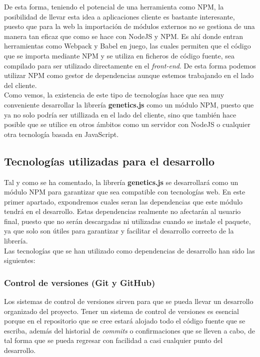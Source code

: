 De esta forma, teniendo el potencial de una herramienta como NPM, la posibilidad de llevar esta idea a aplicaciones cliente es bastante interesante, puesto que para la web la importación de módulos externos no se gestiona de una manera tan eficaz que como se hace con NodeJS y NPM. Es ahí donde entran herramientas como Webpack \cite{webpack} y Babel \cite{babel} en juego, las cuales permiten que el código que se importa mediante NPM y se utiliza en ficheros de código fuente, sea compilado para ser utilizado directamente en el \textit{front-end}. De esta forma podemos utilizar NPM como gestor de dependencias aunque estemos trabajando en el lado del cliente. \\

Como vemos, la existencia de este tipo de tecnologías hace que sea muy conveniente desarrollar la librería \textbf{genetics.js} como un módulo NPM, puesto que ya no solo podría ser utillizada en el lado del cliente, sino que también hace posible que se utilice en otros ámbitos como un servidor con NodeJS o cualquier otra tecnología basada en JavaScript.

\subsection{Tecnologías utilizadas para el desarrollo}

Tal y como se ha comentado, la librería \textbf{genetics.js} se desarrollará como un módulo NPM para garantizar que sea compatible con tecnologías web. En este primer apartado, expondremos cuales seran las dependencias que este módulo tendrá en el desarrollo. Estas dependencias realmente no afectarán al usuario final, puesto que no serán descargadas ni utilizadas cuando se instale el paquete, ya que solo son útiles para garantizar y facilitar el desarrollo correcto de la librería. \\

Las tecnologías que se han utilizado como dependencias de desarrollo han sido las siguientes:

\subsubsection{Control de versiones (Git y GitHub)}

Los sistemas de control de versiones sirven para que se pueda llevar un desarrollo organizado del proyecto. Tener un sistema de control de versiones es esencial porque en el repositorio que se cree estará alojado todo el código fuente que se escriba, además del historial de \textit{commits} o confirmaciones que se lleven a cabo, de tal forma que se pueda regresar con facilidad a casi cualquier punto del desarrollo. \\

